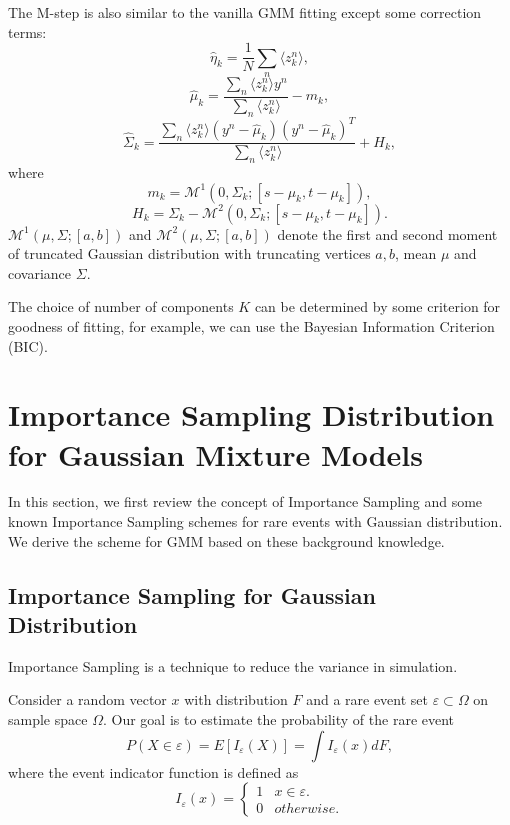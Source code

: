 \documentclass[conference]{IEEEtran}
\begin{document}
The M-step is also similar to the vanilla GMM fitting except some correction terms:
\begin{equation}
\hat{\eta}_k =\frac{1}{N} \sum_n \langle z_k^n \rangle ,
\end{equation}
\begin{equation}
\hat{\mu}_k =\frac{\sum_n \langle z_k^n \rangle y^n}{\sum_n \langle z_k^n \rangle} - m_k ,
\end{equation}
\begin{equation}
\hat{\Sigma}_k =\frac{\sum_n \langle z_k^n \rangle (y^n-\hat{\mu}_k)(y^n-\hat{\mu}_k)^T}{\sum_n \langle z_k^n \rangle}+ H_k ,
\end{equation}
where\begin{equation}
m_k=\mathcal{M}^1(0,\Sigma_k;[s-\mu_k,t-\mu_k]),
\end{equation}
\begin{equation}
H_k=\Sigma_k-\mathcal{M}^2(0,\Sigma_k;[s-\mu_k,t-\mu_k]).
\end{equation}
$\mathcal{M}^1(\mu,\Sigma;[a,b])$ and $\mathcal{M}^2(\mu,\Sigma;[a,b])$ denote the first and second moment of truncated Gaussian distribution with truncating vertices $a,b$, mean $\mu$ and covariance $\Sigma$.

The choice of number of components $K$ can be determined by some criterion for goodness of fitting, for example, we can use the Bayesian Information Criterion (BIC).

\section{Importance Sampling Distribution for Gaussian Mixture Models}\label{sec:is}
In this section, we first review the concept of Importance Sampling and some known Importance Sampling schemes for rare events with Gaussian distribution. We derive the scheme for GMM based on these background knowledge.
\subsection{Importance Sampling for Gaussian Distribution}
Importance Sampling is a technique to reduce the variance in simulation. 

Consider a random vector $x$ with distribution $F$ and a rare event set $\varepsilon \subset \Omega$ on sample space $\Omega$. Our goal is to estimate the probability of the rare event \begin{equation}
{P}(X \in \varepsilon)=E[I_\varepsilon(X)]=\int I_\varepsilon(x) dF,
\end{equation} where the event indicator function is defined as\begin{equation}
	I_\varepsilon(x)=\begin{cases} 1 & x \in \varepsilon.\\
0 & otherwise.\end{cases}
\end{equation}
\end{document}
